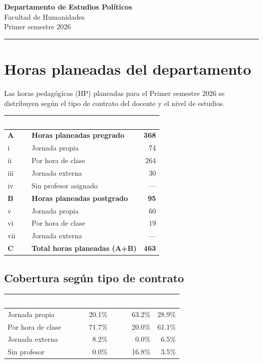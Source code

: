 \documentclass[11pt, a4paper]{article}
\begin{document}
\begin{center}
  {\Large\bfseries\color{usachDark} Departamento de Estudios Políticos} \\[0.4em]
  {\large\color{usachTeal} Facultad de Humanidades} \\[0.2em]
  {\normalsize\color{gray} Primer semestre 2026}
\end{center}
\vspace{0.5em}
\textcolor{usachTeal}{\rule{\linewidth}{2pt}}
\vspace{1em}

\section{Horas planeadas del departamento}

Las horas pedagógicas (HP) planeadas para el Primer semestre 2026 se distribuyen según el tipo de contrato del docente y el nivel de estudios.

\begin{tabularx}{\linewidth}{l X r}
\toprule
\rowcolor{usachDark} \textbf{\textcolor{white}{Cód.}} & \textbf{\textcolor{white}{Descripción}} & \textbf{\textcolor{white}{HP}} \\
\midrule
\rowcolor{rowHighlight}\textbf{A} & \textbf{Horas planeadas pregrado} & \textbf{368} \\
\rowcolor{rowEven}i & Jornada propia & 74 \\
ii & Por hora de clase & 264 \\
\rowcolor{rowEven}iii & Jornada externa & 30 \\
iv & Sin profesor asignado & --- \\
\rowcolor{rowHighlight}\textbf{B} & \textbf{Horas planeadas postgrado} & \textbf{95} \\
v & Jornada propia & 60 \\
\rowcolor{rowEven}vi & Por hora de clase & 19 \\
vii & Jornada externa & --- \\
\rowcolor{rowHighlight}\textbf{C} & \textbf{Total horas planeadas (A+B)} & \textbf{463} \\
\bottomrule
\end{tabularx}

\subsection{Cobertura según tipo de contrato}

\begin{tabular}{lrrr}
\toprule
\rowcolor{usachDark} \textbf{\textcolor{white}{Tipo de contrato}} & \textbf{\textcolor{white}{Pregrado}} & \textbf{\textcolor{white}{Postgrado}} & \textbf{\textcolor{white}{Total}} \\
\midrule
Jornada propia & 20.1\% & 63.2\% & 28.9\% \\
\rowcolor{rowEven}Por hora de clase & 71.7\% & 20.0\% & 61.1\% \\
Jornada externa & 8.2\% & 0.0\% & 6.5\% \\
\rowcolor{rowEven}Sin profesor & 0.0\% & 16.8\% & 3.5\% \\
\bottomrule
\end{tabular}
\end{document}
